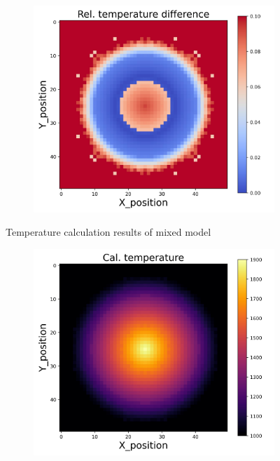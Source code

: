 {\begin{figure}[h]
\begin{minipage}{\textwidth}
\begin{subfigure}{0.27\textwidth}
        \end{subfigure}
        \begin{subfigure}{0.27\textwidth}
            \centering
            \includegraphics[width=\textwidth]{figures/raw_data/33/mix/T_bias.jpg}
        \end{subfigure}
    \end{minipage}
    \caption{Temperature calculation results of mixed model}  
\end{figure}
\begin{figure}[p]
    \centering
    \begin{minipage}{\textwidth}
        \centering
        \begin{subfigure}{0.325\textwidth}
            \centering
            \includegraphics[width=\textwidth]{figures/raw_data/0/mix/T_cal.jpg}

\end{subfigure}
\end{minipage}
\end{figure}}
